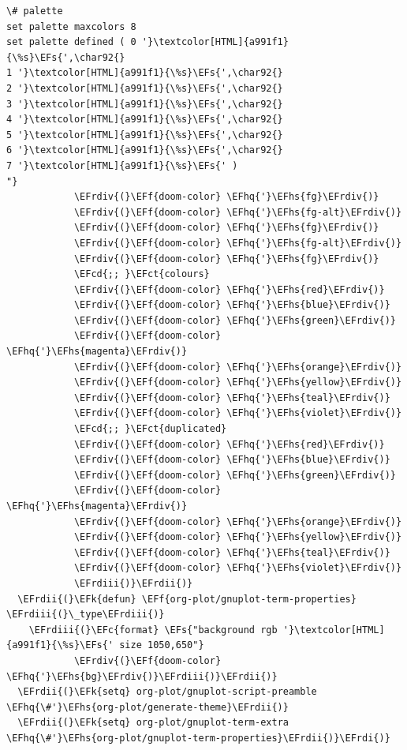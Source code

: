 \documentclass{scrartcl}
\newcommand{\EFk}[1]{\textcolor{EFk}{#1}} %
\newcommand{\EFs}[1]{\textcolor{EFs}{#1}} %
\newcommand{\EFct}[1]{\textcolor{EFct}{#1}} %
\newcommand{\EFc}[1]{\textcolor{EFc}{#1}} %
\newcommand{\EFf}[1]{\textcolor{EFf}{#1}} %
\newcommand{\EFcd}[1]{\textcolor{EFcd}{#1}} %
\newcommand{\EFhq}[1]{#1} %
\newcommand{\EFhs}[1]{#1} %
\newcommand{\EFrdi}[1]{#1} %
\newcommand{\EFrdii}[1]{#1} %
\newcommand{\EFrdiii}[1]{#1} %
\newcommand{\EFrdiv}[1]{#1} %
\begin{document}
\begin{Code}
\begin{Verbatim}[]
\# palette
set palette maxcolors 8
set palette defined ( 0 '}\textcolor[HTML]{a991f1}{\%s}\EFs{',\char92{}
1 '}\textcolor[HTML]{a991f1}{\%s}\EFs{',\char92{}
2 '}\textcolor[HTML]{a991f1}{\%s}\EFs{',\char92{}
3 '}\textcolor[HTML]{a991f1}{\%s}\EFs{',\char92{}
4 '}\textcolor[HTML]{a991f1}{\%s}\EFs{',\char92{}
5 '}\textcolor[HTML]{a991f1}{\%s}\EFs{',\char92{}
6 '}\textcolor[HTML]{a991f1}{\%s}\EFs{',\char92{}
7 '}\textcolor[HTML]{a991f1}{\%s}\EFs{' )
"}
            \EFrdiv{(}\EFf{doom-color} \EFhq{'}\EFhs{fg}\EFrdiv{)}
            \EFrdiv{(}\EFf{doom-color} \EFhq{'}\EFhs{fg-alt}\EFrdiv{)}
            \EFrdiv{(}\EFf{doom-color} \EFhq{'}\EFhs{fg}\EFrdiv{)}
            \EFrdiv{(}\EFf{doom-color} \EFhq{'}\EFhs{fg-alt}\EFrdiv{)}
            \EFrdiv{(}\EFf{doom-color} \EFhq{'}\EFhs{fg}\EFrdiv{)}
            \EFcd{;; }\EFct{colours}
            \EFrdiv{(}\EFf{doom-color} \EFhq{'}\EFhs{red}\EFrdiv{)}
            \EFrdiv{(}\EFf{doom-color} \EFhq{'}\EFhs{blue}\EFrdiv{)}
            \EFrdiv{(}\EFf{doom-color} \EFhq{'}\EFhs{green}\EFrdiv{)}
            \EFrdiv{(}\EFf{doom-color} \EFhq{'}\EFhs{magenta}\EFrdiv{)}
            \EFrdiv{(}\EFf{doom-color} \EFhq{'}\EFhs{orange}\EFrdiv{)}
            \EFrdiv{(}\EFf{doom-color} \EFhq{'}\EFhs{yellow}\EFrdiv{)}
            \EFrdiv{(}\EFf{doom-color} \EFhq{'}\EFhs{teal}\EFrdiv{)}
            \EFrdiv{(}\EFf{doom-color} \EFhq{'}\EFhs{violet}\EFrdiv{)}
            \EFcd{;; }\EFct{duplicated}
            \EFrdiv{(}\EFf{doom-color} \EFhq{'}\EFhs{red}\EFrdiv{)}
            \EFrdiv{(}\EFf{doom-color} \EFhq{'}\EFhs{blue}\EFrdiv{)}
            \EFrdiv{(}\EFf{doom-color} \EFhq{'}\EFhs{green}\EFrdiv{)}
            \EFrdiv{(}\EFf{doom-color} \EFhq{'}\EFhs{magenta}\EFrdiv{)}
            \EFrdiv{(}\EFf{doom-color} \EFhq{'}\EFhs{orange}\EFrdiv{)}
            \EFrdiv{(}\EFf{doom-color} \EFhq{'}\EFhs{yellow}\EFrdiv{)}
            \EFrdiv{(}\EFf{doom-color} \EFhq{'}\EFhs{teal}\EFrdiv{)}
            \EFrdiv{(}\EFf{doom-color} \EFhq{'}\EFhs{violet}\EFrdiv{)}
            \EFrdiii{)}\EFrdii{)}
  \EFrdii{(}\EFk{defun} \EFf{org-plot/gnuplot-term-properties} \EFrdiii{(}\_type\EFrdiii{)}
    \EFrdiii{(}\EFc{format} \EFs{"background rgb '}\textcolor[HTML]{a991f1}{\%s}\EFs{' size 1050,650"}
            \EFrdiv{(}\EFf{doom-color} \EFhq{'}\EFhs{bg}\EFrdiv{)}\EFrdiii{)}\EFrdii{)}
  \EFrdii{(}\EFk{setq} org-plot/gnuplot-script-preamble \EFhq{\#'}\EFhs{org-plot/generate-theme}\EFrdii{)}
  \EFrdii{(}\EFk{setq} org-plot/gnuplot-term-extra \EFhq{\#'}\EFhs{org-plot/gnuplot-term-properties}\EFrdii{)}\EFrdi{)}
\end{Verbatim}
\end{Code}
\end{document}
